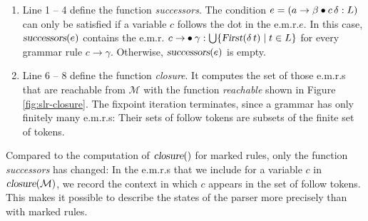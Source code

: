 \begin{enumerate}
\item Line 1 -- 4 define the function \textsl{successors}.  The condition
      $e = (a\rightarrow\beta\mdot{}c\,\delta:L)$ can only be satisfied if a variable $c$ follows the dot in the
      e.m.r.\@ $e$.  In this case, $\textsl{successors}(e)$ contains the e.m.r.\@
      $c\rightarrow\mdot\gamma:\bigcup\{\textsl{First}(\delta\,t)\mid{}t\in{}L\}$ for every grammar rule
      $c \rightarrow \gamma$.  Otherwise, $\textsl{successors}(e)$ is empty.
\item Line 6 -- 8 define the function \textsl{closure}.  It computes the set of those e.m.r.s that are reachable
      from $\mathcal{M}$ with the function \textsl{reachable} shown in Figure \ref{fig:slr-closure}.  The fixpoint
      iteration terminates, since a grammar has only finitely many e.m.r.s:  Their sets of follow tokens are subsets
      of the finite set of tokens.
\end{enumerate}
Compared to the computation of $\textsl{closure}()$ for marked rules, only the function \textsl{successors} has
changed:  In the e.m.r.s that we include for a variable $c$ in $\textsl{closure}(\mathcal{M})$, we record the
context in which $c$ appears in the set of follow tokens.  This makes it possible to describe the states of the
parser more precisely than with marked rules.
\vspace*{0.2cm}

